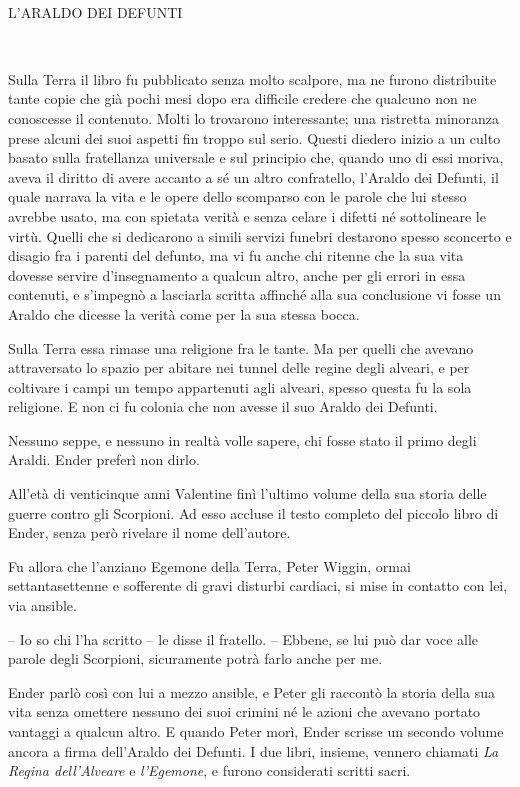 {~}

\begin{center}
	{L'ARALDO DEI DEFUNTI}
\end{center}

{~}

{Sulla Terra il libro fu pubblicato senza molto scalpore, ma ne furono
	distribuite tante copie che già pochi mesi dopo era difficile credere
	che qualcuno non ne conoscesse il contenuto. Molti lo trovarono
	interessante; una ristretta minoranza prese alcuni dei suoi aspetti fin
	troppo sul serio. Questi diedero inizio a un culto basato sulla
	fratellanza universale e sul principio che, quando uno di essi moriva,
	aveva il diritto di avere accanto a sé un altro confratello, l'Araldo
	dei Defunti, il quale narrava la vita e le opere dello scomparso con le
	parole che lui stesso avrebbe usato, ma con spietata verità e senza
	celare i difetti né sottolineare le virtù. Quelli che si dedicarono a
	simili servizi funebri destarono spesso sconcerto e disagio fra i
	parenti del defunto, ma vi fu anche chi ritenne che la sua vita dovesse
	servire d'insegnamento a qualcun altro, anche per gli errori in essa
	contenuti, e s'impegnò a lasciarla scritta affinché alla sua conclusione
	vi fosse un Araldo che dicesse la verità come per la sua stessa bocca.}

{Sulla Terra essa rimase una religione fra le tante. Ma per quelli che
	avevano attraversato lo spazio per abitare nei tunnel delle regine degli
	alveari, e per coltivare i campi un tempo appartenuti agli alveari,
	spesso questa fu la sola religione. E non ci fu colonia che non avesse
	il suo Araldo dei Defunti.}

{Nessuno seppe, e nessuno in realtà volle sapere, chi fosse stato il
	primo degli Araldi. Ender preferì non dirlo.}

{All'età di venticinque anni Valentine finì l'ultimo volume della sua
	storia delle guerre contro gli Scorpioni. Ad esso accluse il testo
	completo del piccolo libro di Ender, senza però rivelare il nome
	dell'autore.}

{Fu allora che l'anziano Egemone della Terra, Peter Wiggin, ormai
	settantasettenne e sofferente di gravi disturbi cardiaci, si mise in
	contatto con lei, via ansible.}

{-- Io so chi l'ha scritto -- le disse il fratello. -- Ebbene, se lui
	può dar voce alle parole degli Scorpioni, sicuramente potrà farlo anche
	per me.}

{Ender parlò così con lui a mezzo ansible, e Peter gli raccontò la
	storia della sua vita senza omettere nessuno dei suoi crimini né le
	azioni che avevano portato vantaggi a qualcun altro. E quando Peter
	morì, Ender scrisse un secondo volume ancora a firma dell'Araldo dei
	Defunti. I due libri, insieme, vennero chiamati \emph{La Regina
		dell'Alveare} e \emph{l'Egemone}, \emph{} e furono considerati scritti
	sacri.}

